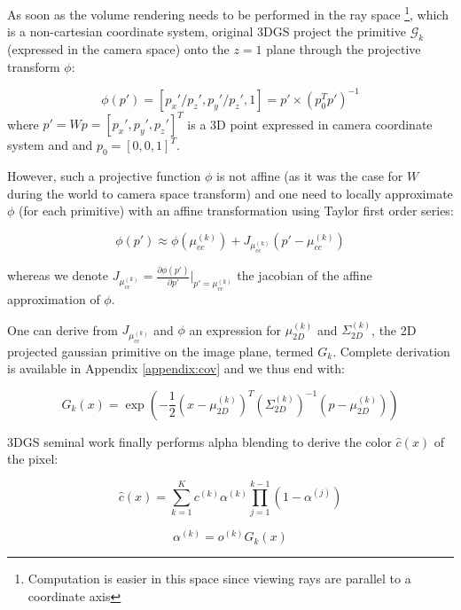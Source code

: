 As soon as the volume rendering needs to be performed in the ray space \footnote{Computation is easier in this space since viewing rays are parallel to a coordinate axis}, which is a non-cartesian coordinate system, original 3D\ac{GS} project the primitive $\mathcal{G}_{k}$ (expressed in the camera space) onto the $z=1$ plane through the projective transform $\phi$: 

\begin{equation}
  \phi(p') = [p_{x}'/p_{z}',p_{y}'/p_{z}',1] = p'\times(p_{0}^{T}p')^{-1}
\end{equation}
where $p'=Wp = [p_{x}',p_{y}',p_{z}']^{T}$ is a 3D point expressed in camera coordinate system and and $p_{0} = [0, 0, 1]^{T}$. \newline

However, such a projective function $\phi$ is not affine (as it was the case for $W$ during the world to camera space transform) and one need to locally approximate $\phi$ (for each primitive) with an affine transformation using Taylor first order series: 

\begin{equation}
  \label{eq:affine_transform}
  \phi(p') \approx \phi(\mu_{cc}^{(k)}) + J_{\mu_{cc}^{(k)}}(p' - \mu_{cc}^{(k)})
\end{equation}

whereas we denote $J_{\mu_{cc}^{(k)}} =  \frac{\partial \phi(p')}{\partial p'}|_{p' = \mu_{cc}^{(k)}}$ the jacobian of the affine approximation of $\phi$. 

One can derive from $J_{\mu_{cc}^{(k)}}$ and $\phi$ an expression for $\mu^{(k)}_{2D}$ and $\Sigma^{(k)}_{2D}$, the 2D projected gaussian primitive on the image plane, termed $G_{k}$. Complete derivation is available in Appendix \ref{appendix:cov} and we thus end with: 

\begin{equation}
  G_{k}(x) = \exp(-\frac{1}{2}(x-\mu^{(k)}_{2D})^{T}(\Sigma^{(k)}_{2D})^{-1}(p-\mu^{(k)}_{2D}))
\end{equation}

3D\ac{GS} seminal work \citep{kerbl20233d} finally performs alpha blending to derive the color $\hat{c}(x)$ of the pixel: 

\begin{equation}
\label{eq:gs-alpha-blending}
  \hat{c}(x) = \sum_{k=1}^{K}c^{(k)}\alpha^{(k)}\prod_{j=1}^{k-1}(1-\alpha^{(j)})
\end{equation}

\begin{equation}
\label{eq:gs-alpha-def}
  \alpha^{(k)} = o^{(k)}G_{k}(x)
\end{equation}

